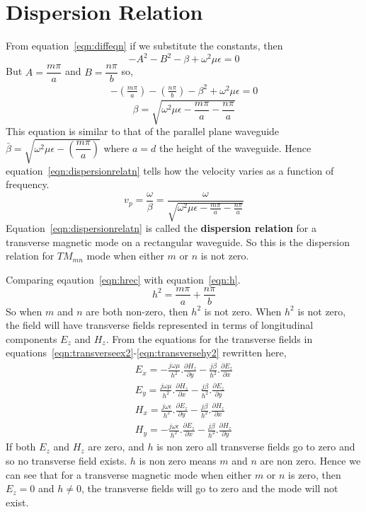 \section{Dispersion Relation}
From equation~\ref{eqn:diffeqn} if we substitute the constants, then
\begin{dmath*}
-A^2 - B^2 - \beta + \omega^2\mu\epsilon = 0
\end{dmath*}
But $A=\dfrac{m\pi}{a}$ and $B=\dfrac{n\pi}{b}$ so,
\begin{align}
-\left(\frac{m\pi}{a}\right) - \left(\frac{n\pi}{b}\right) - \beta^{2} + {\omega^2\mu\epsilon} = 0
\label{eqn:hrec}
\end{align}
\begin{equation}
\beta = \sqrt{{\omega^2\mu\epsilon} - \frac{m\pi}{a} - \frac{n\pi}{a}}
\label{eqn:dispersionrelatn}
\end{equation}
This equation is similar to that of the parallel plane waveguide $\bar{\beta} = \sqrt{\omega^2\mu\epsilon - \left(\dfrac{m\pi}{a}\right)}$ where $a=d$ the height of the waveguide. Hence equation~\ref{eqn:dispersionrelatn} tells how the velocity varies as a function of frequency.
\begin{dmath*}
v_p = \frac{\omega}{\beta} = \frac{\omega}{\sqrt{{\omega^2\mu\epsilon} - \frac{m\pi}{a} - \frac{n\pi}{a}}}
\end{dmath*}
Equation~\ref{eqn:dispersionrelatn} is called the \textbf{dispersion relation} for a transverse magnetic mode on a rectangular waveguide. So this is the dispersion relation for $TM_{mn}$ mode when either $m$ or $n$ is not zero. 

Comparing eqaution~\ref{eqn:hrec} with equation~\ref{eqn:h}.
\begin{dmath*}
h^{2} =  \frac{m\pi}{a} + \frac{n\pi}{b}
\end{dmath*} 
So when $m$ and $n$ are both non-zero, then $h^2$ is not zero. When $h^2$ is not zero, the field will have transverse fields represented in terms of longitudinal components $E_z$ and $H_z$. From the equations for the transverse fields in equations~\ref{eqn:transverseex2}-\ref{eqn:transversehy2} rewritten here,
\begin{align*}
E_x = -\frac{j\omega\mu}{h^2}.\frac{\partial H_z}{\partial y} - \frac{j\beta}{h^2}.\frac{\partial E_z}{\partial x}\\
E_y = \frac{j\omega\mu}{h^2}.\frac{\partial H_z}{\partial x} - \frac{j\beta}{h^2}.\frac{\partial E_z}{\partial y}\\
H_x = \frac{j\omega\epsilon}{h^2}.\frac{\partial E_z}{\partial y} - \frac{j\beta}{h^2}.\frac{\partial H_z}{\partial x}\\
H_y = -\frac{j\omega\epsilon}{h^2}.\frac{\partial E_z}{\partial x} - \frac{j\beta}{h^2}.\frac{\partial H_z}{\partial y}
\end{align*}
If both $E_z$ and $H_z$ are zero, and $h$ is non zero all transverse fields go to zero and so no transverse field exists. $h$ is non zero means $m$ and $n$ are non zero. Hence we can see that for a transverse magnetic mode when either $m$ or $n$ is zero, then $E_z=0$ and $h\neq 0$, the transverse fields will go to zero and the mode will not exist.

